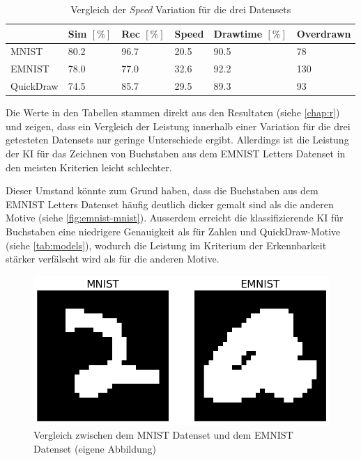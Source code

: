 \begin{table}[!ht]
    \centering
    \caption{Vergleich der \emph{Speed} Variation für die drei Datensets}\label{tab:speed-3-dataset}
    \begin{tabular}{|l|l|l|l|l|l|}
            \hline ~ & Sim $[\%]$ & Rec $[\%]$ & Speed & Drawtime $[\%]$ & Overdrawn \\ \hline
            MNIST & 80.2 & 96.7 & 20.5 & 90.5 & 78 \\ \hline
            EMNIST & 78.0 & 77.0 & 32.6 & 92.2 & 130 \\ \hline
            QuickDraw & 74.5 & 85.7 & 29.5 & 89.3 & 93 \\ \hline
        \end{tabular}
\end{table}

Die Werte in den Tabellen stammen direkt aus den Resultaten (siehe \ref{chap:r})
und zeigen, dass ein Vergleich der Leistung innerhalb einer Variation für die
drei getesteten Datensets nur geringe Unterschiede ergibt. Allerdings ist die
Leistung der KI für das Zeichnen von Buchstaben aus dem EMNIST Letters Datenset
in den meisten Kriterien leicht schlechter.

Dieser Umstand könnte zum Grund haben, dass die Buchstaben aus dem EMNIST
Letters Datenset häufig deutlich dicker gemalt sind als die anderen Motive
(siehe \autoref{fig:emnist-mnist}). Ausserdem erreicht die klassifizierende KI
für Buchstaben eine niedrigere Genauigkeit als für Zahlen und QuickDraw-Motive
(siehe \autoref{tab:models}), wodurch die Leistung im Kriterium der
Erkennbarkeit stärker verfälscht wird als für die anderen Motive.

\begin{figure}[!ht]
	\centering
	\includegraphics[width=\textwidth-2cm]{images/diskussion/emnist-mnist.png}
	\caption{Vergleich zwischen dem MNIST Datenset und dem EMNIST Datenset
	(eigene Abbildung)}\label{fig:emnist-mnist}
\end{figure}
  

